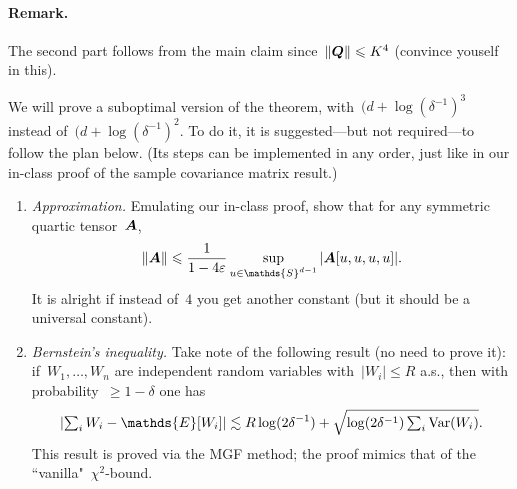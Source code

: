 \documentclass[11pt]{article}
\newcommand{\E}{\mathds{E}}
\newcommand{\Var}{\textup{Var}}
\newcommand{\Sphere}{\mathds{S}}
\newcommand{\veps}{\varepsilon}
\newcommand{\lsim}{\lesssim}
\newcommand{\leqs}{\leqslant}
\newcommand{\geqs}{\geqslant}
\renewcommand{\le}{\leqs}
\renewcommand{\ge}{\geqs}
\begin{document}
\paragraph{Remark.} The second part follows from the main claim since~$\|\bQ\| \le K^4$ (convince youself in this).

We will prove a suboptimal version of the theorem, with~$(d + \log(\delta^{-1})^3$ instead of~$(d + \log(\delta^{-1})^2$. 
To do it, it is suggested---but not required---to follow the plan below. 
(Its steps can be implemented in any order, just like in our in-class proof of the sample covariance matrix result.)

\begin{enumerate}
\item {\em Approximation.} 
Emulating our in-class proof, show that for any symmetric quartic tensor~$\boldsymbol{A}$, 
\[
\| \bA \| \le \frac{1}{1-4\veps} \sup_{u \in \Sphere^{d-1}} |\bA[u,u,u,u]|. 
\]
It is alright if instead of~$4$ you get another constant (but it should be a universal constant).
\item {\em Bernstein's inequality.}
Take note of the following result (no need to prove it): if~$W_1, \dots, W_n$ are independent random variables with~$|W_i| \le R$ a.s., 
then with probability~$\ge 1-\delta$ one has
\[
\left| \textstyle\sum_{i} W_i - \E[W_i] \right|
\lsim R\log(2\delta^{-1}) + \sqrt{\log(2\delta^{-1}) \textstyle\sum_{i} \Var(W_i)}.
\]
This result is proved via the MGF method; the proof mimics that of the ``vanilla"~$\chi^2$-bound.


\end{enumerate}
\end{document}

